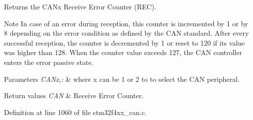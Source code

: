 Returns the C\-A\-Nx Receive Error Counter (R\-E\-C). 

\begin{DoxyNote}{Note}
In case of an error during reception, this counter is incremented by 1 or by 8 depending on the error condition as defined by the C\-A\-N standard. After every successful reception, the counter is decremented by 1 or reset to 120 if its value was higher than 128. When the counter value exceeds 127, the C\-A\-N controller enters the error passive state. 
\end{DoxyNote}

\begin{DoxyParams}{Parameters}
{\em C\-A\-Nx,\-:} & where x can be 1 or 2 to to select the C\-A\-N peripheral. \\
\hline
\end{DoxyParams}

\begin{DoxyRetVals}{Return values}
{\em C\-A\-N} & Receive Error Counter. \\
\hline
\end{DoxyRetVals}


Definition at line 1060 of file stm32f4xx\-\_\-can.\-c.

